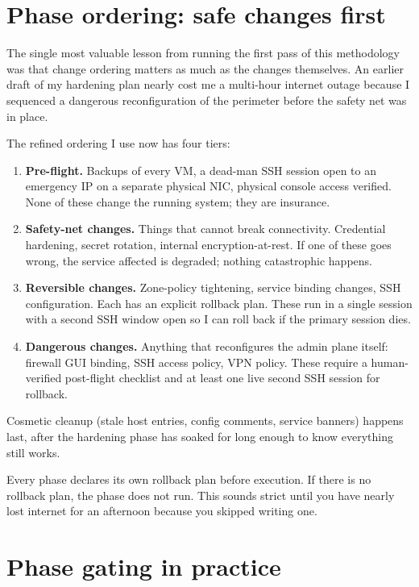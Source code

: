 \documentclass[12pt]{article}
\begin{document}
\section{Phase ordering: safe changes first}

The single most valuable lesson from running the first pass of this methodology was that change ordering matters as much as the changes themselves. An earlier draft of my hardening plan nearly cost me a multi-hour internet outage because I sequenced a dangerous reconfiguration of the perimeter before the safety net was in place.

The refined ordering I use now has four tiers:

\begin{enumerate}[leftmargin=18pt,itemsep=4pt]
  \item \textbf{Pre-flight.} Backups of every VM, a dead-man SSH session open to an emergency IP on a separate physical NIC, physical console access verified. None of these change the running system; they are insurance.
  \item \textbf{Safety-net changes.} Things that cannot break connectivity. Credential hardening, secret rotation, internal encryption-at-rest. If one of these goes wrong, the service affected is degraded; nothing catastrophic happens.
  \item \textbf{Reversible changes.} Zone-policy tightening, service binding changes, SSH configuration. Each has an explicit rollback plan. These run in a single session with a second SSH window open so I can roll back if the primary session dies.
  \item \textbf{Dangerous changes.} Anything that reconfigures the admin plane itself: firewall GUI binding, SSH access policy, VPN policy. These require a human-verified post-flight checklist and at least one live second SSH session for rollback.
\end{enumerate}

Cosmetic cleanup (stale host entries, config comments, service banners) happens last, after the hardening phase has soaked for long enough to know everything still works.

Every phase declares its own rollback plan before execution. If there is no rollback plan, the phase does not run. This sounds strict until you have nearly lost internet for an afternoon because you skipped writing one.

\section{Phase gating in practice}
\end{document}
